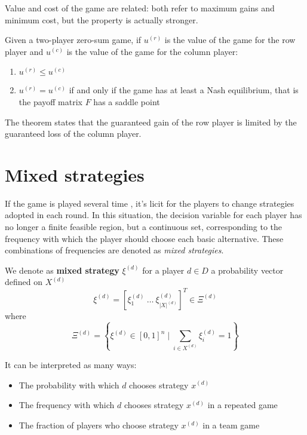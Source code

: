 Value and cost of the game are related: both refer to maximum gains and minimum cost, but the property is actually stronger. \\

\begin{theo}
	Given a two-player zero-sum game, if $u^{(r)}$ is the value of the game for the row player and $u^{(c)}$ is the value of the game for the column player:
	\begin{enumerate}
		\item $u^{(r)} \leq u^{(c)}$
		
		\item $u^{(r)} = u^{(c)}$ if and only if the game has at least a Nash equilibrium, that is the payoff matrix $F$ has a saddle point
	\end{enumerate}
\end{theo}

The theorem states that the guaranteed gain of the row player is limited by the guaranteed loss of the column player.

\section{Mixed strategies}
\label{sec:mixedstrats}

If the game is played several time , it's licit for the players to change strategies adopted in each round. In this situation, the decision variable for each player has no longer a finite feasible region, but a continuous set, corresponding to the frequency with which the player should choose each basic alternative. These combinations of frequencies are denoted as \textit{mixed strategies}. \\

\begin{definition}
	We denote as \textbf{mixed strategy} $\xi^{(d)}$ for a player $d \in D$ a probability vector defined on $X^{(d)}$ 
	$$ \xi^{(d)} = \left[\xi^{(d)}_1 \ \dots \ \xi^{(d)}_{|X|^{(d)}}\right]^T \in \Xi^{(d)} $$
	where 
	$$ \Xi^{(d)} = \left\{\xi^{(d)} \in [0,1]^n \mid \sum_{i \in X^{(d)}} \xi^{(d)}_i = 1 \right\} $$
\end{definition}

It can be interpreted as many ways: 
\begin{itemize}
	\item The probability with which $d$ chooses strategy $x^{(d)}$
	
	\item The frequency with which $d$ chooses strategy $x^{(d)}$ in a repeated game 
	
	\item The fraction of players who choose strategy $x^{(d)}$ in a team game
\end{itemize}

